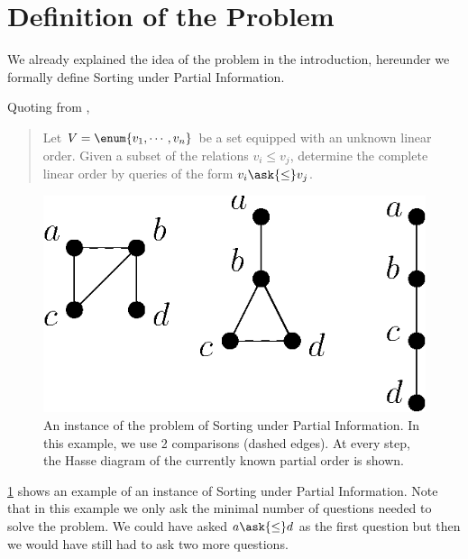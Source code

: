 \section{Definition of the Problem}

We already explained the idea of the problem in the introduction, hereunder we
formally define Sorting under Partial Information.

Quoting from \citet*{cardinal:2013},

\begin{quotation}
Let $V = \enum{v_1 , \cdots , v_n}$ be a set
equipped with an unknown linear order. Given a subset of the relations $v_i
\leq v_j$, determine the complete linear order by queries of the form
\(v_i \ask{\leq} v_j\).
\end{quotation}


\begin{figure} \centering \includegraphics[height=0.2\textheight]{fig/supi/ex2}
\caption{An instance of the problem of Sorting under Partial Information. In
this example, we use 2 comparisons (dashed edges). At every step, the Hasse
diagram of the currently known partial order is shown.}
\label{fig:supi:def:ex2} \end{figure}


\ref{fig:supi:def:ex2} shows an example of an instance of Sorting under Partial
Information. Note that in this example we only ask the minimal number of
questions needed to solve the problem. We could have asked $a \ask{\le}
d$ as the first question but then we would have still had to ask two more
questions.
